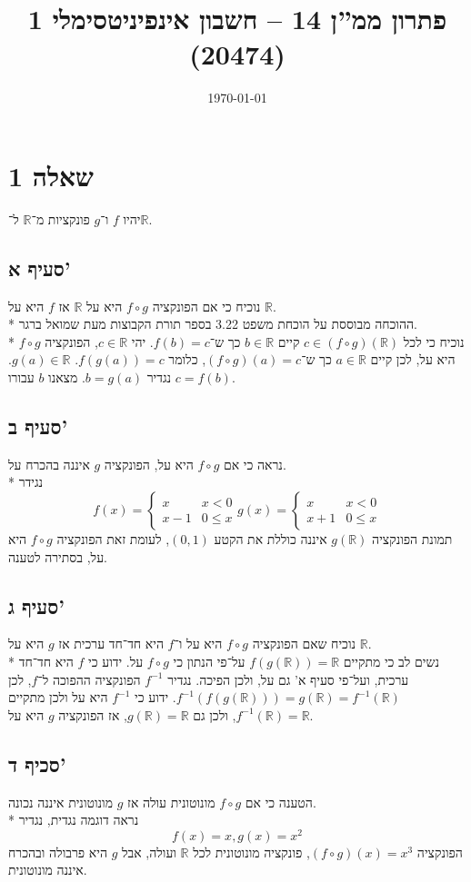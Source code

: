 \documentclass[a4paper]{article}
\title{פתרון ממ''ן 14 – חשבון אינפיניטסימלי 1 (20474)}
\author{\AUTHOR}
\date\today
\def\RR{\mathbb{R}}
\begin{document}
\maketitle
\section{שאלה 1}
יהיו $f$ ו־$g$ פונקציות מ־$\RR$ ל־$\RR$.
\subsection{סעיף א'}
נוכיח כי אם הפונקציה $f \circ g$ היא על $\RR$ אז $f$ היא על $\RR$. \\*
ההוכחה מבוססת על הוכחת משפט 3.22 בספר תורת הקבוצות מעת שמואל ברגר. \\*
נוכיח כי לכל $c \in (f \circ g)(\RR)$ קיים $b \in \RR$ כך ש־$f(b) = c$.
יהי $c \in \RR$, הפונקציה $f \circ g$ היא על, לכן קיים $a \in \RR$
כך ש־$(f \circ g)(a) = c$, כלומר $f(g(a)) = c$. $g(a) \in \RR$.
נגדיר $b = g(a)$. מצאנו $b$ עבורו $c = f(b)$.

\subsection{סעיף ב'}
נראה כי אם $f \circ g$ היא על, הפונקציה $g$ איננה בהכרח על. \\*
נגידר
\[
	f(x) = \begin{cases}
		x & x < 0 \\
		x - 1 & 0 \le x
	\end{cases}
	g(x) = \begin{cases}
		x & x < 0 \\
		x + 1 & 0 \le x
	\end{cases}
\]
תמונת הפונקציה $g(\RR)$ איננה כוללת את הקטע $(0, 1)$,
לעומת זאת הפונקציה $f \circ g$ היא על, בסתירה לטענה.

\subsection{סעיף ג'}
נוכיח שאם הפונקציה $f \circ g$ היא על ו־$f$
היא חד־חד ערכית אז $g$ היא על $\RR$. \\*
נשים לב כי מתקיים $f(g(\RR)) = \RR$ על־פי הנתון כי $f \circ g$ על.
ידוע כי $f$ היא חד־חד ערכית, ועל־פי סעיף א' גם על, ולכן הפיכה.
נגדיר $f^{-1}$ הפונקציה ההפוכה ל־$f$,
לכן $f^{-1}(f(g(\RR))) = g(\RR) = f^{-1}(\RR)$.
ידוע כי $f^{-1}$ היא על ולכן מתקיים $f^{-1}(\RR) = \RR$,
ולכן גם $g(\RR) = \RR$, אז הפונקציה $g$ היא על.

\subsection{סכיף ד'}
הטענה כי אם $f \circ g$ מונוטונית עולה אז $g$ מונוטונית איננה נכונה. \\*
נראה דוגמה נגדית, נגדיר
\[
	f(x) = x,
	g(x) = x^2
\]
הפונקציה $(f \circ g)(x) = x^3$, פונקציה מונוטונית לכל $\RR$ ועולה,
אבל $g$ היא פרבולה ובהכרח איננה מונוטונית.
\end{document}
